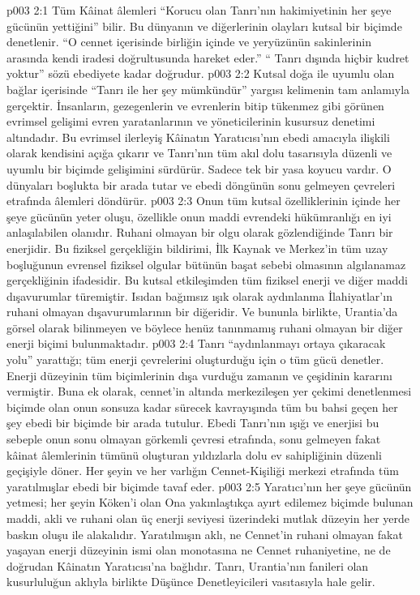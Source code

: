\vs p003 2:1 Tüm Kâinat âlemleri “Korucu olan Tanrı’nın hakimiyetinin her şeye gücünün yettiğini” bilir. Bu dünyanın ve diğerlerinin olayları kutsal bir biçimde denetlenir. “O cennet içerisinde birliğin içinde ve yeryüzünün sakinlerinin arasında kendi iradesi doğrultusunda hareket eder.” “ Tanrı dışında hiçbir kudret yoktur” sözü ebediyete kadar doğrudur.
\vs p003 2:2 Kutsal doğa ile uyumlu olan bağlar içerisinde “Tanrı ile her şey mümkündür” yargısı kelimenin tam anlamıyla gerçektir. İnsanların, gezegenlerin ve evrenlerin bitip tükenmez gibi görünen evrimsel gelişimi evren yaratanlarının ve yöneticilerinin kusursuz denetimi altındadır. Bu evrimsel ilerleyiş Kâinatın Yaratıcısı’nın ebedi amacıyla ilişkili olarak kendisini açığa çıkarır ve Tanrı’nın tüm akıl dolu tasarısıyla düzenli ve uyumlu bir biçimde gelişimini sürdürür. Sadece tek bir yasa koyucu vardır. O dünyaları boşlukta bir arada tutar ve ebedi döngünün sonu gelmeyen çevreleri etrafında âlemleri döndürür.
\vs p003 2:3 Onun tüm kutsal özelliklerinin içinde her şeye gücünün yeter oluşu, özellikle onun maddi evrendeki hükümranlığı en iyi anlaşılabilen olanıdır. Ruhani olmayan bir olgu olarak gözlendiğinde Tanrı bir enerjidir. Bu fiziksel gerçekliğin bildirimi, İlk Kaynak ve Merkez’in tüm uzay boşluğunun evrensel fiziksel olgular bütünün başat sebebi olmasının algılanamaz gerçekliğinin ifadesidir. Bu kutsal etkileşimden tüm fiziksel enerji ve diğer maddi dışavurumlar türemiştir. Isıdan bağımsız ışık olarak aydınlanma İlahiyatlar’ın ruhani olmayan dışavurumlarının bir diğeridir. Ve bununla birlikte, Urantia’da görsel olarak bilinmeyen ve böylece henüz tanınmamış ruhani olmayan bir diğer enerji biçimi bulunmaktadır.
\vs p003 2:4 Tanrı “aydınlanmayı ortaya çıkaracak yolu” yarattığı; tüm enerji çevrelerini oluşturduğu için o tüm gücü denetler. Enerji düzeyinin tüm biçimlerinin dışa vurduğu zamanın ve çeşidinin kararını vermiştir. Buna ek olarak, cennet’in altında merkezileşen yer çekimi denetlenmesi biçimde olan onun sonsuza kadar sürecek kavrayışında tüm bu bahsi geçen her şey ebedi bir biçimde bir arada tutulur. Ebedi Tanrı’nın ışığı ve enerjisi bu sebeple onun sonu olmayan görkemli çevresi etrafında, sonu gelmeyen fakat kâinat âlemlerinin tümünü oluşturan yıldızlarla dolu ev sahipliğinin düzenli geçişiyle döner. Her şeyin ve her varlığın Cennet\hyp{}Kişiliği merkezi etrafında tüm yaratılmışlar ebedi bir biçimde tavaf eder.
\vs p003 2:5 Yaratıcı’nın her şeye gücünün yetmesi; her şeyin Köken’i olan Ona yakınlaştıkça ayırt edilemez biçimde bulunan maddi, akli ve ruhani olan üç enerji seviyesi üzerindeki mutlak düzeyin her yerde baskın oluşu ile alakalıdır. Yaratılmışın aklı, ne Cennet’in ruhani olmayan fakat yaşayan enerji düzeyinin ismi olan monotasına ne Cennet ruhaniyetine, ne de doğrudan Kâinatın Yaratıcısı’na bağlıdır. Tanrı, Urantia’nın fanileri olan kusurluluğun aklıyla birlikte Düşünce Denetleyicileri vasıtasıyla  hale gelir.
